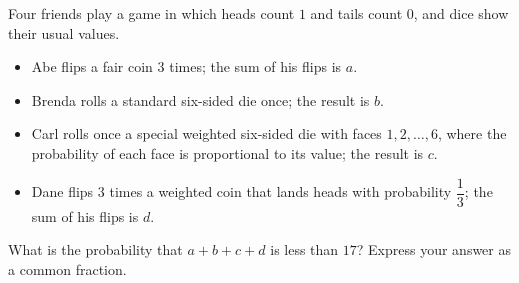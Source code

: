 Four friends play a game in which heads count $1$ and tails count $0$, and dice show their usual values.
\begin{itemize}
\item Abe flips a fair coin $3$ times; the sum of his flips is $a$.
\item Brenda rolls a standard six-sided die once; the result is $b$.
\item Carl rolls once a special weighted six-sided die with faces $1,2,\ldots,6$, where the probability of each face is proportional to its value; the result is $c$.
\item Dane flips $3$ times a weighted coin that lands heads with probability $\dfrac{1}{3}$; the sum of his flips is $d$.
\end{itemize}
What is the probability that $a+b+c+d$ is less than $17$? Express your answer as a common fraction.
